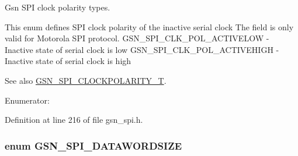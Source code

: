 Gsn SPI clock polarity types. 

This enum defines SPI clock polarity of the inactive serial clock The field is only valid for Motorola SPI protocol. GSN\_\-SPI\_\-CLK\_\-POL\_\-ACTIVELOW -\/ Inactive state of serial clock is low GSN\_\-SPI\_\-CLK\_\-POL\_\-ACTIVEHIGH -\/ Inactive state of serial clock is high

\begin{DoxySeeAlso}{See also}
\hyperlink{a00655_ga40c914db809ec79fd3a564dda8364aea}{GSN\_\-SPI\_\-CLOCKPOLARITY\_\-T}. 
\end{DoxySeeAlso}
\begin{Desc}
\item[Enumerator: ]\par
\begin{description}
\item[{\em 
\hypertarget{a00655_gga6d27ddbf02c08f4f80f88328bb907f94ab175071e88453ab1b63abe5db3500175}{
GSN\_\-SPI\_\-CLK\_\-POL\_\-INACTIVELOW}
\label{a00655_gga6d27ddbf02c08f4f80f88328bb907f94ab175071e88453ab1b63abe5db3500175}
}]\item[{\em 
\hypertarget{a00655_gga6d27ddbf02c08f4f80f88328bb907f94af27b1c22561eb85366ce7e10e0d9e7f5}{
GSN\_\-SPI\_\-CLK\_\-POL\_\-INACTIVEHIGH}
\label{a00655_gga6d27ddbf02c08f4f80f88328bb907f94af27b1c22561eb85366ce7e10e0d9e7f5}
}]\end{description}
\end{Desc}



Definition at line 216 of file gsn\_\-spi.h.

\hypertarget{a00655_ga52e3e63232981dd9e13226ef140541bf}{
\subsubsection[{GSN\_\-SPI\_\-DATAWORDSIZE}]{\setlength{\rightskip}{0pt plus 5cm}enum {\bf GSN\_\-SPI\_\-DATAWORDSIZE}}}
\label{a00655_ga52e3e63232981dd9e13226ef140541bf}


